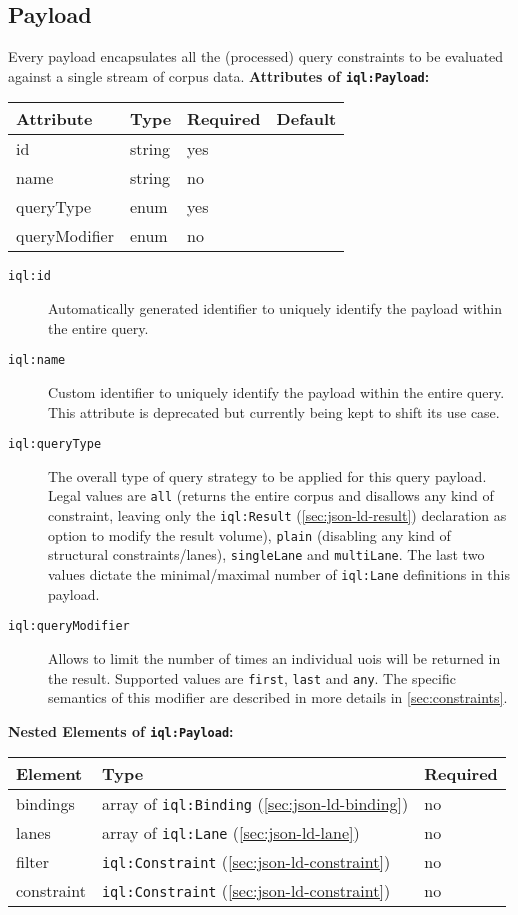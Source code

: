 \documentclass[11pt,a4paper,portrait]{article}
\newcommand{\iqlns}{iql:}
\newcommand{\iqlType}[1]{\texttt{\iqlns#1}}
\newcommand{\desc}[1]{\noindent#1\newline\medskip}
\newenvironment{attributes}[1]{
\noindent\textbf{Attributes of #1:}\newline\medskip
\begin{tabular}{|p{0.3\textwidth}|p{0.20\textwidth}|p{0.20\textwidth}|p{0.17\textwidth}|}
	\hline
	\textbf{Attribute} & \textbf{Type} & \textbf{Required} & \textbf{Default} \\ 
	\hline
	\hline
}{
\end{tabular}
}
\newcommand{\attribute}[4]{
	#1 & #2 & #3 & #4 \\
	\hline
}
\newenvironment{elements}[1]{
\noindent\textbf{Nested Elements of #1:}\newline\medskip
\begin{tabular}{|p{0.3\textwidth}|p{0.42\textwidth}|p{0.17\textwidth}|}
	\hline
	\textbf{Element} & \textbf{Type} & \textbf{Required} \\ 
	\hline
	\hline
}{
\end{tabular}
}
\newcommand{\element}[3]{
#1 & #2 & #3 \\
\hline
}
\begin{document}
\subsection{Payload}
\label{sec:json-ld-payload}
\desc{Every payload encapsulates all the (processed) query constraints to be evaluated against a single stream of corpus data.}
\begin{attributes}{\iqlType{Payload}}
	\attribute{id}{string}{yes}{}
	\attribute{name}{string}{no}{}
	\attribute{queryType}{enum}{yes}{}
	\attribute{queryModifier}{enum}{no}{}
\end{attributes}
\begin{description}
	\item[\iqlType{id}] Automatically generated identifier to uniquely identify the payload within the entire query.
	\item[\iqlType{name}] Custom identifier to uniquely identify the payload within the entire query. This attribute is deprecated but currently being kept to shift its use case.
	\item[\iqlType{queryType}] The overall type of query strategy to be applied for this query payload. Legal values are \texttt{all} (returns the entire corpus and disallows any kind of constraint, leaving only the \iqlType{Result} (\ref{sec:json-ld-result}) declaration as option to modify the result volume), \texttt{plain} (disabling any kind of structural constraints/lanes), \texttt{singleLane} and \texttt{multiLane}. The last two values dictate the minimal/maximal number of \iqlType{Lane} definitions in this payload.
	\item[\iqlType{queryModifier}] Allows to limit the number of times an individual \acp{uoi} will be returned in the result. Supported values are \texttt{first}, \texttt{last} and \texttt{any}. The specific semantics of this modifier are described in more details in \cref{sec:constraints}.
\end{description}
\begin{elements}{\iqlType{Payload}}
	\element{bindings}{array of \iqlType{Binding} (\ref{sec:json-ld-binding})}{no}
	\element{lanes}{array of \iqlType{Lane} (\ref{sec:json-ld-lane})}{no}
	\element{filter}{\iqlType{Constraint} (\ref{sec:json-ld-constraint})}{no}
	\element{constraint}{\iqlType{Constraint} (\ref{sec:json-ld-constraint})}{no}
\end{elements}
\end{document}
